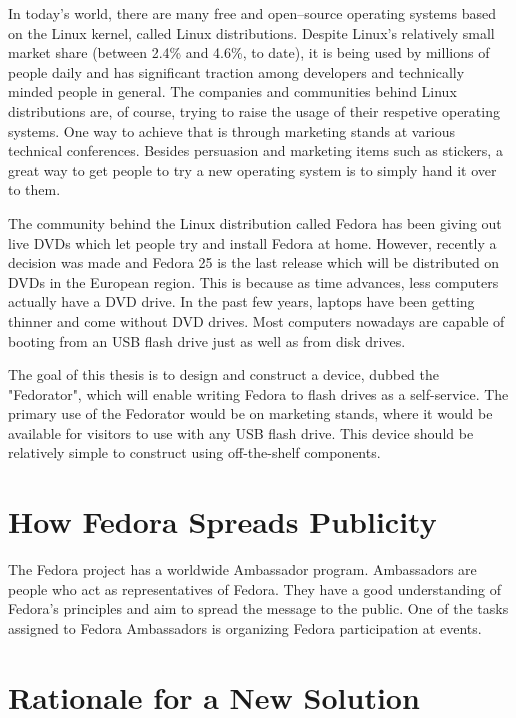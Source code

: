 \label{Introduction}
    In today's world, there are many free and open–source operating systems based on the Linux kernel, called Linux distributions\cite{whatislinux}.  Despite Linux's relatively small market share (between 2.4\% and 4.6\%, to date\cite{linuxmarketshare}), it is being used by millions of people daily and has significant traction among developers\cite{sosurvey} and technically minded people in general.  The companies and communities behind Linux distributions are, of course, trying to raise the usage of their respetive operating systems.  One way to achieve that is through marketing stands at various technical conferences.  Besides persuasion and marketing items such as stickers, a great way to get people to try a new operating system is to simply hand it over to them.

    The community behind the Linux distribution called Fedora\cite{fedora} has been giving out live DVDs which let people try and install Fedora at home.  However, recently a decision was made and Fedora 25 is the last release which will be distributed on DVDs in the European region.  This is because as time advances, less computers actually have a DVD drive.  In the past few years, laptops have been getting thinner and come without DVD drives\cite{laptopdvd}.  Most computers nowadays are capable of booting from an USB flash drive just as well as from disk drives.
    
    The goal of this thesis is to design and construct a device, dubbed the "Fedorator", which will enable writing Fedora to flash drives as a self-service.  The primary use of the Fedorator would be on marketing stands, where it would be available for visitors to use with any USB flash drive.  This device should be relatively simple to construct using off-the-shelf components.
    \section{How Fedora Spreads Publicity}
        The Fedora project has a worldwide Ambassador program.  Ambassadors are people who act as representatives of Fedora.  They have a good understanding of Fedora's principles and aim to spread the message to the public\cite{fedora-ambassadors}.  One of the tasks assigned to Fedora Ambassadors is organizing Fedora participation at events.
        \blind[3]
    \section{Rationale for a New Solution}
        \blind[3]
